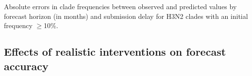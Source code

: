 \documentclass[9pt,lineno]{elife}
\begin{document}
\begin{table}[htb]
  \begin{center}
    
    \caption{Absolute errors in clade frequencies between observed and predicted values by forecast horizon (in months) and submission delay for H3N2 clades with an initial frequency $\geq$10\%.}
    \label{tab:h3n2_absolute_forecast_frequency_errors}
  \end{center}
\end{table}

\subsection{Effects of realistic interventions on forecast accuracy}
\end{document}
